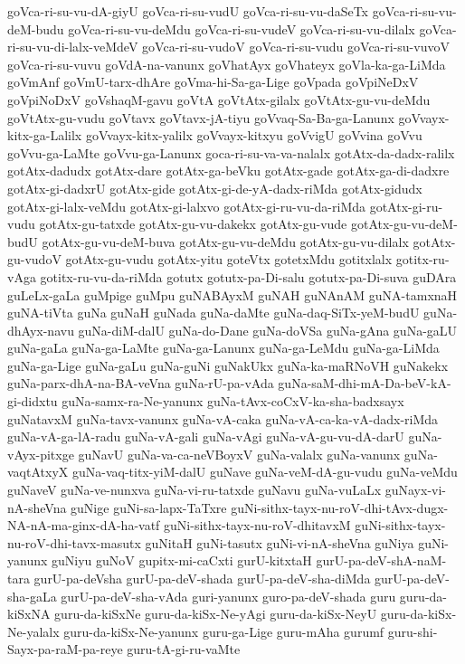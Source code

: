 {goVca-ri-su-vu-dA-giyU
goVca-ri-su-vudU
goVca-ri-su-vu-daSeTx
goVca-ri-su-vu-deM-budu
goVca-ri-su-vu-deMdu
goVca-ri-su-vudeV
goVca-ri-su-vu-dilalx
goVca-ri-su-vu-di-lalx-veMdeV
goVca-ri-su-vudoV
goVca-ri-su-vudu
goVca-ri-su-vuvoV
goVca-ri-su-vuvu
goVdA-na-vanunx
goVhatAyx
goVhateyx
goVla-ka-ga-LiMda
goVmAnf
goVmU-tarx-dhAre
goVma-hi-Sa-ga-Lige
goVpada
goVpiNeDxV
goVpiNoDxV
goVshaqM-gavu
goVtA
goVtAtx-gilalx
goVtAtx-gu-vu-deMdu
goVtAtx-gu-vudu
goVtavx
goVtavx-jA-tiyu
goVvaq-Sa-Ba-ga-Lanunx
goVvayx-kitx-ga-Lalilx
goVvayx-kitx-yalilx
goVvayx-kitxyu
goVvigU
goVvina
goVvu
goVvu-ga-LaMte
goVvu-ga-Lanunx
goca-ri-su-va-va-nalalx
gotAtx-da-dadx-ralilx
gotAtx-dadudx
gotAtx-dare
gotAtx-ga-beVku
gotAtx-gade
gotAtx-ga-di-dadxre
gotAtx-gi-dadxrU
gotAtx-gide
gotAtx-gi-de-yA-dadx-riMda
gotAtx-gidudx
gotAtx-gi-lalx-veMdu
gotAtx-gi-lalxvo
gotAtx-gi-ru-vu-da-riMda
gotAtx-gi-ru-vudu
gotAtx-gu-tatxde
gotAtx-gu-vu-dakekx
gotAtx-gu-vude
gotAtx-gu-vu-deM-budU
gotAtx-gu-vu-deM-buva
gotAtx-gu-vu-deMdu
gotAtx-gu-vu-dilalx
gotAtx-gu-vudoV
gotAtx-gu-vudu
gotAtx-yitu
goteVtx
gotetxMdu
gotitxlalx
gotitx-ru-vAga
gotitx-ru-vu-da-riMda
gotutx
gotutx-pa-Di-salu
gotutx-pa-Di-suva
guDAra
guLeLx-gaLa
guMpige
guMpu
guNABAyxM
guNAH
guNAnAM
guNA-tamxnaH
guNA-tiVta
guNa
guNaH
guNada
guNa-daMte
guNa-daq-SiTx-yeM-budU
guNa-dhAyx-navu
guNa-diM-dalU
guNa-do-Dane
guNa-doVSa
guNa-gAna
guNa-gaLU
guNa-gaLa
guNa-ga-LaMte
guNa-ga-Lanunx
guNa-ga-LeMdu
guNa-ga-LiMda
guNa-ga-Lige
guNa-gaLu
guNa-guNi
guNakUkx
guNa-ka-maRNoVH
guNakekx
guNa-parx-dhA-na-BA-veVna
guNa-rU-pa-vAda
guNa-saM-dhi-mA-Da-beV-kA-gi-didxtu
guNa-samx-ra-Ne-yanunx
guNa-tAvx-coCxV-ka-sha-badxsayx
guNatavxM
guNa-tavx-vanunx
guNa-vA-caka
guNa-vA-ca-ka-vA-dadx-riMda
guNa-vA-ga-lA-radu
guNa-vA-gali
guNa-vAgi
guNa-vA-gu-vu-dA-darU
guNa-vAyx-pitxge
guNavU
guNa-va-ca-neVBoyxV
guNa-valalx
guNa-vanunx
guNa-vaqtAtxyX
guNa-vaq-titx-yiM-dalU
guNave
guNa-veM-dA-gu-vudu
guNa-veMdu
guNaveV
guNa-ve-nunxva
guNa-vi-ru-tatxde
guNavu
guNa-vuLaLx
guNayx-vi-nA-sheVna
guNige
guNi-sa-lapx-TaTxre
guNi-sithx-tayx-nu-roV-dhi-tAvx-dugx-NA-nA-ma-ginx-dA-ha-vatf
guNi-sithx-tayx-nu-roV-dhitavxM
guNi-sithx-tayx-nu-roV-dhi-tavx-masutx
guNitaH
guNi-tasutx
guNi-vi-nA-sheVna
guNiya
guNi-yanunx
guNiyu
guNoV
gupitx-mi-caCxti
gurU-kitxtaH
gurU-pa-deV-shA-naM-tara
gurU-pa-deVsha
gurU-pa-deV-shada
gurU-pa-deV-sha-diMda
gurU-pa-deV-sha-gaLa
gurU-pa-deV-sha-vAda
guri-yanunx
guro-pa-deV-shada
guru
guru-da-kiSxNA
guru-da-kiSxNe
guru-da-kiSx-Ne-yAgi
guru-da-kiSx-NeyU
guru-da-kiSx-Ne-yalalx
guru-da-kiSx-Ne-yanunx
guru-ga-Lige
guru-mAha
gurumf
guru-shi-Sayx-pa-raM-pa-reye
guru-tA-gi-ru-vaMte
}
